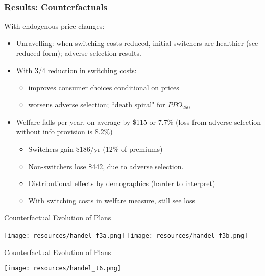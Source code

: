 \begin{frame}
\frametitle{Results: Counterfactuals}

With endogenous price changes:
\begin{itemize}
\item Unravelling: when switching costs reduced, initial switchers are healthier (see reduced form); adverse selection results.
\item With $3/4$ reduction in switching costs: 

\begin{itemize}
\item improves consumer choices conditional on prices
\item worsens adverse selection; ``death spiral" for $PPO_{250}$
\end{itemize}


\item Welfare falls per year, on average by \$115 or 7.7\% (loss from adverse selection without info provision is 8.2\%)
\begin{itemize}
\item Switchers gain \$186/yr (12\% of premiums)
\item Non-switchers lose \$442, due to adverse selection.
\item Distributional effects by demographics (harder to interpret)
\item With switching costs in welfare measure, still see loss
\end{itemize}
\end{itemize}
\end{frame}

\begin{frame}{Counterfactual Evolution of Plans}
\begin{center}
\texttt{[image: resources/handel\_f3a.png]}
\texttt{[image: resources/handel\_f3b.png]}
\end{center}
\end{frame}


\begin{frame}{Counterfactual Evolution of Plans}
\begin{center}
\texttt{[image: resources/handel\_t6.png]}
\end{center}
\end{frame}


